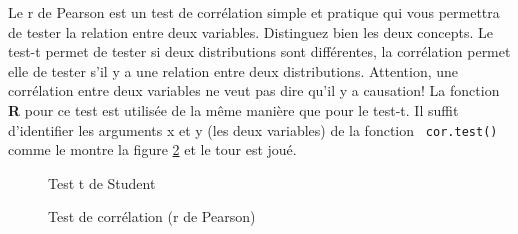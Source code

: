 \documentclass[10.5pt,a4paper]{article}
\newcommand{\rcode}[1]{\texttt{\color{rstudio} #1}}
\begin{document}
  Le r de Pearson est un test de corrélation simple et pratique qui vous permettra de tester la relation entre deux variables. Distinguez bien les deux concepts. Le test-t permet de tester si deux distributions sont différentes, la corrélation permet elle de tester s'il y a une relation entre deux distributions. Attention, une corrélation entre deux variables ne veut pas dire qu'il y a causation! La fonction \textbf{R} pour ce test est utilisée de la même manière que pour le test-t. Il suffit d'identifier les arguments x et y (les deux variables) de la fonction \rcode{cor.test()} comme le montre la figure \ref{anaPearCorr} et le tour est joué.
  
  \begin{figure}[H]
    \centering
    \caption{Test t de Student}
    \label{anaTtest}
    \end{figure}
    
    \begin{figure}[H]
    \centering
    \caption{Test de corrélation (r de Pearson)}
    \label{anaPearCorr}
    \end{figure}
  
\end{document}
